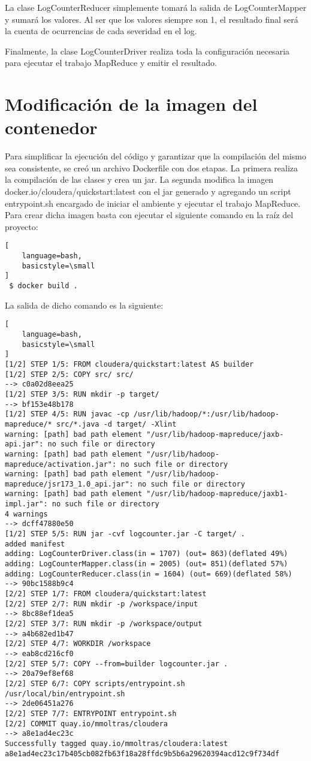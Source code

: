 \documentclass[a4paper]{article}
\begin{document}
La clase LogCounterReducer simplemente tomará la salida de LogCounterMapper y
sumará los valores. Al ser que los valores siempre son 1, el resultado final
será la cuenta de ocurrencias de cada severidad en el log.

Finalmente, la clase LogCounterDriver realiza toda la configuración necesaria
para ejecutar el trabajo MapReduce y emitir el resultado.

\section{Modificación de la imagen del contenedor}

Para simplificar la ejecución del código y garantizar que la compilación del
mismo sea consistente, se creó un archivo Dockerfile con dos etapas. La primera
realiza la compilación de las clases y crea un jar. La segunda modifica la
imagen docker.io/cloudera/quickstart:latest con el jar generado y agregando
un script entrypoint.sh encargado de iniciar el ambiente y ejecutar el trabajo
MapReduce. Para crear dicha imagen basta con ejecutar el siguiente comando en
la raíz del proyecto:

\begin{lstlisting}[
    language=bash,
    basicstyle=\small
]
 $ docker build .
\end{lstlisting}

La salida de dicho comando es la siguiente:

\begin{lstlisting}[
    language=bash,
    basicstyle=\small
]
[1/2] STEP 1/5: FROM cloudera/quickstart:latest AS builder
[1/2] STEP 2/5: COPY src/ src/
--> c0a02d8eea25
[1/2] STEP 3/5: RUN mkdir -p target/
--> bf153e48b178
[1/2] STEP 4/5: RUN javac -cp /usr/lib/hadoop/*:/usr/lib/hadoop-mapreduce/* src/*.java -d target/ -Xlint
warning: [path] bad path element "/usr/lib/hadoop-mapreduce/jaxb-api.jar": no such file or directory
warning: [path] bad path element "/usr/lib/hadoop-mapreduce/activation.jar": no such file or directory
warning: [path] bad path element "/usr/lib/hadoop-mapreduce/jsr173_1.0_api.jar": no such file or directory
warning: [path] bad path element "/usr/lib/hadoop-mapreduce/jaxb1-impl.jar": no such file or directory
4 warnings
--> dcff47880e50
[1/2] STEP 5/5: RUN jar -cvf logcounter.jar -C target/ .
added manifest
adding: LogCounterDriver.class(in = 1707) (out= 863)(deflated 49%)
adding: LogCounterMapper.class(in = 2005) (out= 851)(deflated 57%)
adding: LogCounterReducer.class(in = 1604) (out= 669)(deflated 58%)
--> 90bc1588b9c4
[2/2] STEP 1/7: FROM cloudera/quickstart:latest
[2/2] STEP 2/7: RUN mkdir -p /workspace/input
--> 8bc88ef1dea5
[2/2] STEP 3/7: RUN mkdir -p /workspace/output
--> a4b682ed1b47
[2/2] STEP 4/7: WORKDIR /workspace
--> eab8cd216cf0
[2/2] STEP 5/7: COPY --from=builder logcounter.jar .
--> 20a79ef8ef68
[2/2] STEP 6/7: COPY scripts/entrypoint.sh /usr/local/bin/entrypoint.sh
--> 2de06451a276
[2/2] STEP 7/7: ENTRYPOINT entrypoint.sh
[2/2] COMMIT quay.io/mmoltras/cloudera
--> a8e1ad4ec23c
Successfully tagged quay.io/mmoltras/cloudera:latest
a8e1ad4ec23c17b405cb082fb63f18a28ffdc9b5b6a29620394acd12c9f734df
\end{lstlisting}
\end{document}
